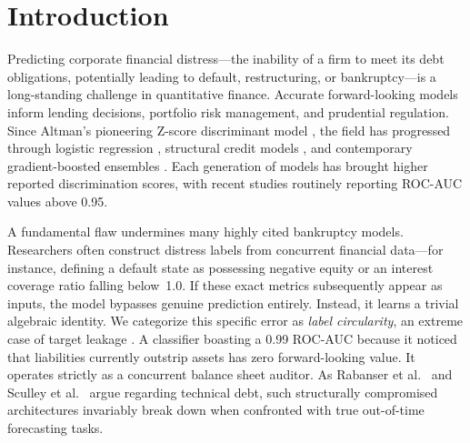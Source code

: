 \documentclass[sigconf,anonymous]{acmart}
\begin{document}


\maketitle

\section{Introduction}

Predicting corporate financial distress---the inability of a firm to meet its debt obligations, potentially leading to default, restructuring, or bankruptcy---is a long-standing challenge in quantitative finance. Accurate forward-looking models inform lending decisions, portfolio risk management, and prudential regulation. Since Altman's pioneering Z-score discriminant model \cite{altman1968}, the field has progressed through logistic regression \cite{ohlson1980}, structural credit models \cite{merton1974}, and contemporary gradient-boosted ensembles \cite{chen2016, ke2017}. Each generation of models has brought higher reported discrimination scores, with recent studies routinely reporting ROC-AUC values above 0.95.

A fundamental flaw undermines many highly cited bankruptcy models. Researchers often construct distress labels from concurrent financial data---for instance, defining a default state as possessing negative equity or an interest coverage ratio falling below~1.0. If these exact metrics subsequently appear as inputs, the model bypasses genuine prediction entirely. Instead, it learns a trivial algebraic identity. We categorize this specific error as \textit{label circularity}, an extreme case of target leakage \cite{sculley2015}. A classifier boasting a 0.99 ROC-AUC because it noticed that liabilities currently outstrip assets has zero forward-looking value. It operates strictly as a concurrent balance sheet auditor. As Rabanser et al.\ \cite{rabanser2019} and Sculley et al.\ \cite{sculley2015} argue regarding technical debt, such structurally compromised architectures invariably break down when confronted with true out-of-time forecasting tasks.
\end{document}
